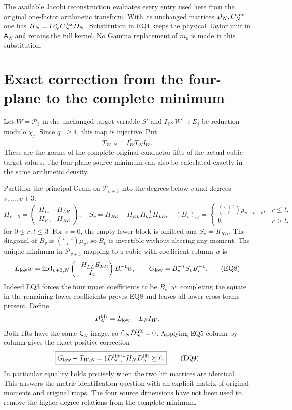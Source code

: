 \documentclass[11pt]{article}
\newcommand{\Pp}{\mathcal P}
\begin{document}
The available Jacobi reconstruction \cite{JC} evaluates every entry
used here from the original one-factor arithmetic transform. With its
unchanged matrices $D_N,C_N^{\rm Jac}$ one has
$H_N=D_N^*C_N^{\rm Jac}D_N$. Substitution in EQ4 keeps the physical
Taylor unit in $\mathsf A_N$ and retains the full kernel. No Gamma
replacement of $m_k$ is made in this substitution.

\section{Exact correction from the four-plane to the complete minimum}
Let $W=\Pp_3$ in the unchanged target variable $S'$ and
$I_W:W\to E_j$ be reduction modulo $\chi_j$. Since $q_-\ge4$,
this map is injective. Put
\[
 T_{W,N}=I_W^*T_NI_W.                                               \tag{EQ6}
\]
These are the norms of the complete original conductor lifts of
the actual cubic target values. The four-plane source minimum can
also be calculated exactly in the same arithmetic density.

Partition the principal Gram on $\Pp_{v+3}$ into the degrees below
$v$ and degrees $v,\ldots,v+3$:
\[
 H_{v+3}=\begin{pmatrix}H_{LL}&H_{LR}\\H_{RL}&H_{RR}\end{pmatrix},
 \quad S_v=H_{RR}-H_{RL}H_{LL}^{-1}H_{LR},
 \quad (B_v)_{rt}=\begin{cases}\binom{v+t}{r}\mu_{v+t-r},&r\le t,\\
 0,&r>t,\end{cases}                                                \tag{EQ7}
\]
for $0\le r,t\le3$. For $v=0$, the empty lower block is omitted
and $S_v=H_{RR}$. The diagonal of $B_v$ is
$\binom{v+t}{v}\mu_v$, so $B_v$ is invertible without altering
any moment. The unique minimum in $\Pp_{v+3}$ mapping to a cubic
with coefficient column $w$ is
\[
 L_{\rm low}w=\operatorname{incl}_{v+3,N}
 \begin{pmatrix}-H_{LL}^{-1}H_{LR}\\I_4\end{pmatrix}B_v^{-1}w,
 \qquad G_{\rm low}=B_v^{-*}S_vB_v^{-1}.                            \tag{EQ8}
\]
Indeed EQ3 forces the four upper coefficients to be $B_v^{-1}w$;
completing the square in the remaining lower coefficients proves
EQ8 and leaves all lower cross terms present. Define
\[
 D_N^{\rm lift}=L_{\rm low}-L_NI_W.
\]
Both lifts have the same $\mathsf C_N$-image, so
$\mathsf C_ND_N^{\rm lift}=0$. Applying EQ5 column by column gives
the exact positive correction
\[
 \boxed{G_{\rm low}-T_{W,N}
       =(D_N^{\rm lift})^*H_ND_N^{\rm lift}\succeq0.}                \tag{EQ9}
\]
In particular equality holds precisely when the two lift matrices
are identical. This answers the metric-identification question with
an explicit matrix of original moments and original maps. The four
source dimensions have not been used to remove the higher-degree
relations from the complete minimum.
\end{document}
